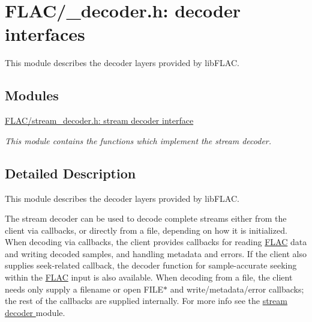 \hypertarget{group__flac__decoder}{}\section{F\+L\+A\+C/\+\_\+decoder.h\+: decoder interfaces}
\label{group__flac__decoder}


This module describes the decoder layers provided by lib\+F\+L\+AC.  


\subsection*{Modules}
\begin{DoxyCompactItemize}
\item 
\hyperlink{group__flac__stream__decoder}{F\+L\+A\+C/stream\+\_\+decoder.\+h\+: stream decoder interface}
\begin{DoxyCompactList}\small\item\em This module contains the functions which implement the stream decoder. \end{DoxyCompactList}\end{DoxyCompactItemize}


\subsection{Detailed Description}
This module describes the decoder layers provided by lib\+F\+L\+AC. 

The stream decoder can be used to decode complete streams either from the client via callbacks, or directly from a file, depending on how it is initialized. When decoding via callbacks, the client provides callbacks for reading \hyperlink{namespace_f_l_a_c}{F\+L\+AC} data and writing decoded samples, and handling metadata and errors. If the client also supplies seek-\/related callback, the decoder function for sample-\/accurate seeking within the \hyperlink{namespace_f_l_a_c}{F\+L\+AC} input is also available. When decoding from a file, the client needs only supply a filename or open {\ttfamily F\+I\+L\+E$\ast$} and write/metadata/error callbacks; the rest of the callbacks are supplied internally. For more info see the \hyperlink{group__flac__stream__decoder}{stream decoder } module. 